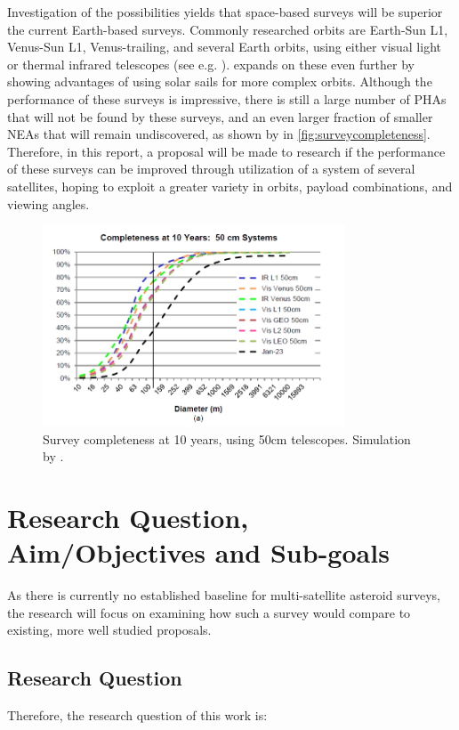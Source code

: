 \documentclass[12pt, english, NoHyper]{AE4010-template}
\begin{document}
Investigation of the possibilities yields that space-based surveys will be superior the current Earth-based surveys. Commonly researched orbits are Earth-Sun L1, Venus-Sun L1, Venus-trailing, and several Earth orbits, using either visual light or thermal infrared telescopes (see e.g. \cite{NEOSDT1}). \cite{ThesisOlga} expands on these even further by showing advantages of using solar sails for more complex orbits. Although the performance of these surveys is impressive, there is still a large number of PHAs that will not be found by these surveys, and an even larger fraction of smaller NEAs that will remain undiscovered, as shown by \cite{NEOSDT2} in \autoref{fig:surveycompleteness}. Therefore, in this report, a proposal will be made to research if the performance of these surveys can be improved through utilization of a system of several satellites, hoping to exploit a greater variety in orbits, payload combinations, and viewing angles.

\begin{figure}[thb]
 \centering
 \includegraphics[width=0.8\textwidth]{figures/surveycompleteness.png}
 \caption{Survey completeness at 10 years, using 50cm telescopes. Simulation by \cite{NEOSDT2}.}
 \label{fig:surveycompleteness}
\end{figure}


\section{Research Question, Aim/Objectives and Sub-goals}
As there is currently no established baseline for multi-satellite asteroid surveys, the research will focus on examining how such a survey would compare to existing, more well studied proposals.

\subsection{Research Question}
Therefore, the research question of this work is:
\end{document}
